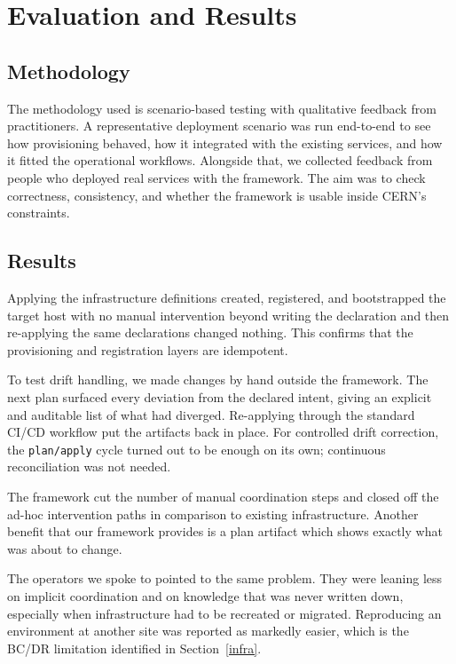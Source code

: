 \section{Evaluation and Results}\label{evaluation}

\subsection{Methodology}
The methodology used is scenario-based testing with qualitative feedback from practitioners. A representative deployment scenario was run end-to-end to see how provisioning behaved, how it integrated with the existing services, and how it fitted the operational workflows. Alongside that, we collected feedback from people who deployed real services with the framework. The aim was to check correctness, consistency, and whether the framework is usable inside CERN's constraints.

\subsection{Results}
Applying the infrastructure definitions created, registered, and bootstrapped the target host with no manual intervention beyond writing the declaration and then re-applying the same declarations changed nothing.
This confirms that the provisioning and registration layers are idempotent.

To test drift handling, we made changes by hand outside the framework. 
The next plan surfaced every deviation from the declared intent, giving an explicit and auditable list of what had diverged. 
Re-applying through the standard CI/CD workflow put the artifacts back in place. 
For controlled drift correction, the \texttt{plan/apply} cycle turned out to be enough on its own; continuous reconciliation was not needed.

The framework cut the number of manual coordination steps and closed off the ad-hoc intervention paths in comparison to existing infrastructure.
Another benefit that our framework provides is a plan artifact which shows exactly what was about to change.

The operators we spoke to pointed to the same problem. They were leaning less on implicit coordination and on knowledge that was never written down, especially when infrastructure had to be recreated or migrated. Reproducing an environment at another site was reported as markedly easier, which is the BC/DR limitation identified in Section~\ref{infra}.
